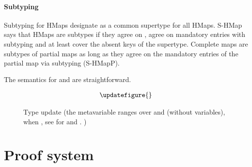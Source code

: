 
\paragraph{Subtyping}
Subtyping for HMaps
designate \MapLiteral{} as a common supertype for all HMaps.
S-HMap says that HMaps are subtypes if they agree
on \completenessmeta{}, agree on mandatory entries with subtyping
and at least cover the absent keys of the supertype.
Complete maps are subtypes of partial maps
as long as they agree on the mandatory entries of the partial map via subtyping (S-HMapP).



The semantics for \getliteral{} and \assocliteral{} are straightforward.

\begin{figure}[t]
  $$
\begin{array}{llll}
\updatefigure{}
\end{array}
$$
\caption{Type update (the metavariable \propisnotmeta{} ranges over \ty{} and \nottype{\ty{}} (without variables), 
  \notsubtypein{}{\Nil{}}{\nottype{\ty{}}} when \issubtypein{}{\Nil{}}{\ty{}}, see
 for \restrictliteral{} and \removeliteral{}.
  )}
\label{main:figure:update}
\end{figure}


\section{Proof system}
\label{formalmodel:proofsystem}

